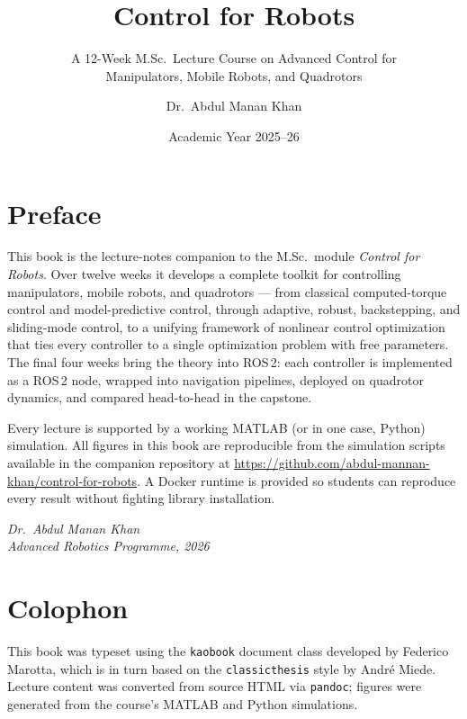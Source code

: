 \documentclass[
    a4paper,
    fontsize=10pt,
    twoside=true,
    open=any,
    numbers=noenddot,
  ]{kaobook}
\title{\huge Control for Robots}
\subtitle{A 12-Week M.Sc.\ Lecture Course on Advanced Control for\\Manipulators, Mobile Robots, and Quadrotors}
\author{Dr.\ Abdul Manan Khan}
\date{Academic Year 2025--26}
\begin{document}
\frontmatter
\maketitle

\chapter*{Preface}
This book is the lecture-notes companion to the M.Sc.\ module \emph{Control for Robots}.
Over twelve weeks it develops a complete toolkit for controlling manipulators, mobile
robots, and quadrotors --- from classical computed-torque control and model-predictive
control, through adaptive, robust, backstepping, and sliding-mode control, to a unifying
framework of nonlinear control optimization that ties every controller to a single
optimization problem with free parameters. The final four weeks bring the theory into
ROS\,2: each controller is implemented as a ROS\,2 node, wrapped into navigation
pipelines, deployed on quadrotor dynamics, and compared head-to-head in the capstone.

Every lecture is supported by a working MATLAB (or in one case, Python) simulation. All
figures in this book are reproducible from the simulation scripts available in the
companion repository at
\url{https://github.com/abdul-mannan-khan/control-for-robots}. A Docker runtime is
provided so students can reproduce every result without fighting library installation.

\bigskip
\noindent\textit{Dr.\ Abdul Manan Khan}\\
\noindent\textit{Advanced Robotics Programme, 2026}

\tableofcontents
\listoffigures
\listoftables

\mainmatter















\appendix
{}
\backmatter

\chapter*{Colophon}
This book was typeset using the \texttt{kaobook} document class developed by
Federico Marotta, which is in turn based on the \texttt{classicthesis} style by
Andr{\'e} Miede. Lecture content was converted from source HTML via \texttt{pandoc};
figures were generated from the course's MATLAB and Python simulations.
\end{document}
